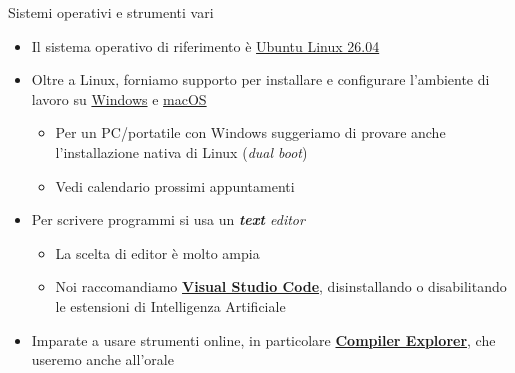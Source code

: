 \begin{frame}{Sistemi operativi e strumenti vari}
  \begin{itemize}[<+->]
  \item Il sistema operativo di riferimento è \href{https://ubuntu.com/desktop}{Ubuntu Linux 26.04}
  \item Oltre a Linux, forniamo supporto per installare e configurare l'ambiente
    di lavoro su
    \href{https://github.com/Programmazione-per-la-Fisica/howto/blob/main/other-OSes/WSLGuide.md}{Windows}
    e
    \href{https://github.com/Programmazione-per-la-Fisica/howto/blob/main/other-OSes/macOSGuide.md}{macOS}
    \begin{itemize}[<.->]
    \item Per un PC/portatile con Windows suggeriamo di provare anche
      l'installazione nativa di Linux (\textit{dual boot})
    \item Vedi calendario prossimi appuntamenti
    \end{itemize}
  \item Per scrivere programmi si usa un \textit{\textbf{text} editor}
    \begin{itemize}[<.->]
    \item La scelta di editor è molto ampia
    \item Noi raccomandiamo \href{https://code.visualstudio.com/}{\textbf{Visual
        Studio Code}}, disinstallando o disabilitando le estensioni di
      Intelligenza Artificiale
    \end{itemize}
  \item Imparate a usare strumenti online, in particolare
    \href{https://godbolt.org/}{\textbf{Compiler Explorer}}, che
    useremo anche all'orale
  \end{itemize}

\end{frame}

